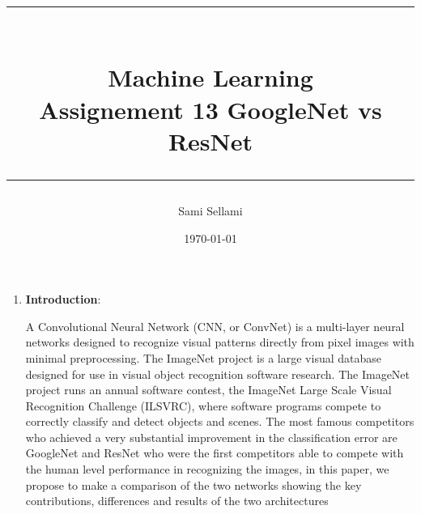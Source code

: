 \documentclass[12pt,a4paper]{report}
\title{
\rule{15cm}{1pt} \\
\Large {\bfseries Machine Learning} \\
\Large {\bfseries Assignement 13 GoogleNet vs ResNet}\\
\rule{15cm}{1pt}}
\author{Sami Sellami}
\date{\today}
\begin{document}
\setcounter{page}{1}
\setcounter{secnumdepth}{1}
	
\selectfont

\maketitle

\titlelabel{\thetitle)\quad}
\titlespacing{\chapter}{0cm}{0cm}{0cm}
\titlespacing{\section}{0.2cm}{0cm}{0cm}


\begin{enumerate}
\item \textbf{Introduction}:

    A Convolutional Neural Network (CNN, or ConvNet) is a multi-layer neural networks designed to recognize visual patterns directly from pixel images with minimal preprocessing. The ImageNet project is a large visual database designed for use in visual object recognition software research. The ImageNet project runs an annual software contest, the ImageNet Large Scale Visual Recognition Challenge (ILSVRC), where software programs compete to correctly classify and detect objects and scenes. The most famous competitors who achieved a very substantial improvement in the classification error are GoogleNet and ResNet who were the first competitors able to compete with the human level performance in recognizing the images, in this paper, we propose to make a comparison of the two networks showing the key contributions, differences and results of the two architectures 
\end{enumerate} 
\end{document}
